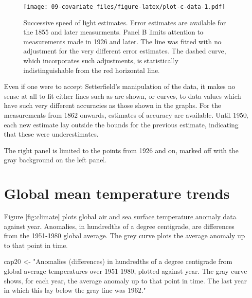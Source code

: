\documentclass[
  10pt,
  b5paper]{book}
\newenvironment{Shaded}{\begin{snugshade}}{\end{snugshade}}
\newcommand{\NormalTok}[1]{#1}
\newcommand{\OtherTok}[1]{\textcolor[rgb]{0.56,0.35,0.01}{#1}}
\newcommand{\StringTok}[1]{\textcolor[rgb]{0.31,0.60,0.02}{#1}}
\begin{document}
\begin{figure}
\centering
\texttt{[image: 09-covariate\_files/figure-latex/plot-c-data-1.pdf]}
\caption{\label{fig:plot-c-data}Successive speed of light estimates.
Error estimates are available for the 1855 and later
measurments. Panel B limits attention to measurements
made in 1926 and later. The line
was fitted with no adjustment for the very different error
estimates. The dashed curve, which incorporates
such adjustments, is statistically indistinguishable
from the red horizontal line.}
\end{figure}

Even if one were to accept Setterfield's manipulation of the data,
it makes no sense at all to fit either lines such as are shown, or
curves, to data values which have such very different
accuracies as those shown in the graphs. For the
measurements from 1862 onwards, estimates of accuracy are
available. Until 1950, each new estimate lay outside the
bounds for the previous estimate, indicating that these
were underestimates.

The right panel is limited to the points from 1926 and on,
marked off with the gray background on the left panel.

\hypertarget{global-mean-temperature-trends}{%
\section{Global mean temperature trends}\label{global-mean-temperature-trends}}

Figure \ref{fig:climate} plots global
\href{http://iridl.ldeo.columbia.edu/SOURCES/.NASA/.GISS/.GISSTEMP/.Global/.LOTI/}{air and sea surface temperature anomaly data}
against year. Anomalies, in hundredths of a degree centigrade, are
differences from the 1951-1980 global average. The grey curve plots
the average anomaly up to that point in time.

\begin{Shaded}
\begin{Highlighting}[]
\NormalTok{cap20 }\OtherTok{\textless{}{-}} \StringTok{"Anomalies (differences) in hundredths of a degree centigrade}
\StringTok{from global average temperatures over 1951{-}1980, plotted against year.}
\StringTok{The gray curve shows, for each year, the average anomaly up to that}
\StringTok{point in time.  The last year in which this lay below the gray line}
\StringTok{was 1962."}
\end{Highlighting}
\end{Shaded}
\end{document}
